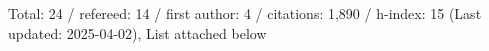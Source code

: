 Total: 24 / refereed: 14 / first author: 4 / citations: 1,890 / h-index: 15 (Last updated: 2025-04-02), List attached below